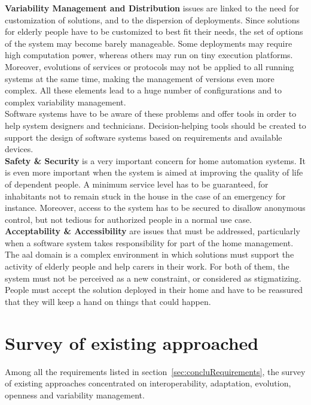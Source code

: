 {\bf Variability Management and Distribution} issues are linked to the need for customization of solutions, and to the dispersion of deployments. Since solutions for elderly people have to be customized to best fit their needs, the set of options of the system may become barely manageable. Some deployments may require high computation power, whereas others may run on tiny execution platforms. Moreover, evolutions of services or protocols may not be applied to all running systems at the same time, making the management of versions even more complex. All these elements lead to a huge number of configurations and to complex variability management.\\
Software systems have to be aware of these problems and offer tools in order to help system designers and technicians. Decision-helping tools should be created to support the design of software systems based on requirements and available devices.\\

{\bf Safety \& Security} is a very important concern for home automation systems. It is even more important when the system is aimed at improving the quality of life of dependent people. A minimum service level has to be guaranteed, for inhabitants not to remain stuck in the house in the case of an emergency for instance. Moreover, access to the system has to be secured to disallow anonymous control, but not tedious for authorized people in a normal use case.\\

{\bf Acceptability \& Accessibility} are issues that must be addressed, particularly when a software system takes responsibility for part of the home management. The \gls{aal} domain is a complex environment in which solutions must support the activity of elderly people and help carers in their work. For both of them, the system must not be perceived as a new constraint, or considered as stigmatizing. People must accept the solution deployed in their home and have to be reassured that they will keep a hand on things that could happen.\\


\section{Survey of existing approached}

Among all the requirements listed in section~\ref{sec:concluRequirements}, the survey of existing approaches concentrated on interoperability, adaptation, evolution, openness and variability management.\\

